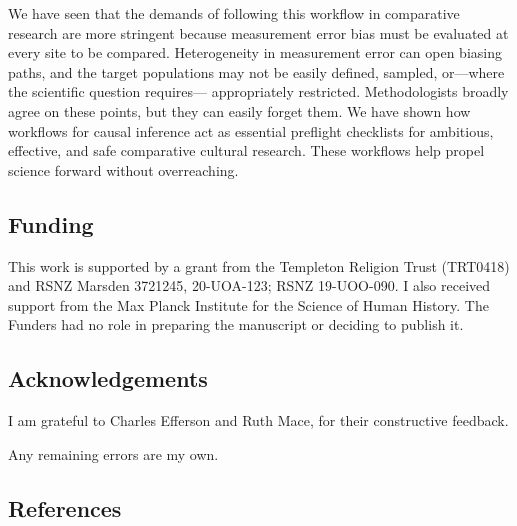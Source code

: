 \documentclass[
  single column]{article}
\begin{document}
We have seen that the demands of following this workflow in comparative
research are more stringent because measurement error bias must be
evaluated at every site to be compared. Heterogeneity in measurement
error can open biasing paths, and the target populations may not be
easily defined, sampled, or---where the scientific question requires---
appropriately restricted. Methodologists broadly agree on these points,
but they can easily forget them. We have shown how workflows for causal
inference act as essential preflight checklists for ambitious,
effective, and safe comparative cultural research. These workflows help
propel science forward without overreaching.

\newpage{}

\subsection{Funding}\label{funding}

This work is supported by a grant from the Templeton Religion Trust
(TRT0418) and RSNZ Marsden 3721245, 20-UOA-123; RSNZ 19-UOO-090. I also
received support from the Max Planck Institute for the Science of Human
History. The Funders had no role in preparing the manuscript or deciding
to publish it.

\subsection{Acknowledgements}\label{acknowledgements}

I am grateful to Charles Efferson and Ruth Mace, for their constructive
feedback.

Any remaining errors are my own.

\newpage{}

\subsection{References}\label{references}
\end{document}
